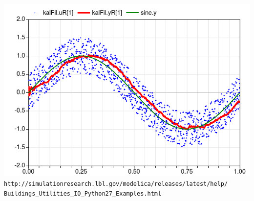\documentclass[11pt,compress,aspectratio=1610]{beamer}
\begin{document}
\begin{frame}
\begin{center}
    \includegraphics[width=\textwidth,height=0.95\textheight,keepaspectratio=true]{../images/KalmanFilter.png}
    \\
    {\scriptsize \texttt{http://simulationresearch.lbl.gov/modelica/releases/latest/help/
    Buildings\_Utilities\_IO\_Python27\_Examples.html} }
\end{center}
\end{frame}
\end{document}
